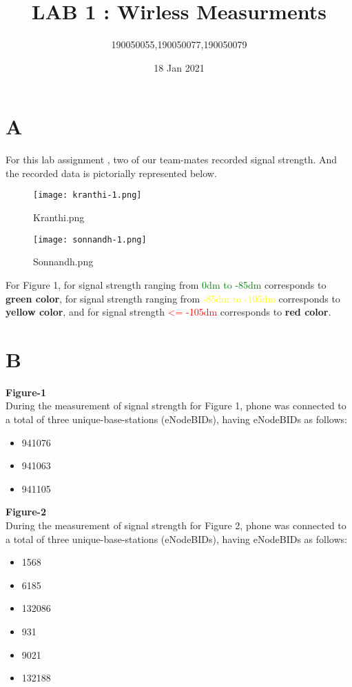 \documentclass[11pt,a4paper]{article}
\title{\textbf{LAB 1 : Wirless Measurments}}
\author{190050055,190050077,190050079}
\date{18 Jan 2021}
\begin{document}
\maketitle 


\newpage
\section{A}
For this lab assignment , two of our team-mates recorded signal strength. And the recorded data is pictorially represented below. 

\begin{SCfigure}[0.5][h]
\caption{Kranthi.png}
\texttt{[image: kranthi-1.png]}
\end{SCfigure}
\begin{SCfigure}[0.5][h]
\caption{Sonnandh.png}
\texttt{[image: sonnandh-1.png]}
\end{SCfigure}
For Figure 1, for signal strength ranging from \textcolor{green}{0dm to -85dm}  corresponds to \textbf{green color}, for signal strength ranging from \textcolor{yellow}{-85dm to -105dm} corresponds to \textbf{yellow color}, and for signal strength \textcolor{red}{<= -105dm} corresponds to \textbf{red color}. 
\\
\vspace{8pt}
\newpage
\section{B}
\vspace{-2pt}
\textbf{\Large{Figure-1}}\\
During the measurement of signal strength for Figure 1, phone was connected to a total of three unique-base-stations (eNodeBIDs), having eNodeBIDs as follows:
\vspace{-8pt}
\begin{itemize}[itemsep = -2 mm]
\item 941076
\item 941063
\item 941105
\end{itemize}

\textbf{\Large{Figure-2}}\\
 During the measurement of signal strength for Figure 2, phone was connected to a total of three unique-base-stations (eNodeBIDs), having eNodeBIDs as follows:
 \vspace{-8pt}
 \begin{itemize}[itemsep = -2mm]
     \item1568
 \item6185
 \item132086
 \item931
 \item9021
 \item132188
 \end{itemize}
\end{document}
